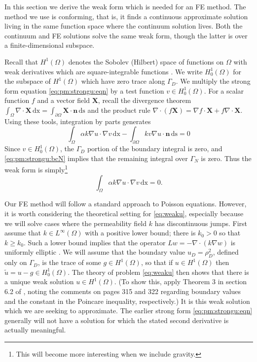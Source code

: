 \documentclass[11pt]{amsart}
\newcommand{\bn}{\mathbf{n}}
\newcommand{\bX}{\mathbf{X}}
\newcommand{\dx}{\mathrm{dx}}
\newcommand{\ds}{\mathrm{ds}}
\newcommand{\Div}{\nabla\cdot}
\newcommand{\grad}{\nabla}
\begin{document}
In this section we derive the weak form which is needed for an FE method.  The method we use is conforming, that is, it finds a continuous approximate solution living in the same function space where the continuum solution lives.  Both the continuum and FE solutions solve the same weak form, though the latter is over a finite-dimensional subspace.

Recall that $H^1(\Omega)$ denotes the Sobolev (Hilbert) space of functions on $\Omega$ with weak derivatives which are square-integrable functions \citep[chapter 5]{Evans2010}.  We write $H_0^1(\Omega)$ for the subspace of $H^1(\Omega)$ which have zero trace along $\Gamma_D$.  We multiply the strong form equation \eqref{eq:pm:strongu:eqn} by a test function $v \in H_0^1(\Omega)$.  For a scalar function $f$ and a vector field $\bX$, recall the divergence theorem $\int_\Omega \Div \bX\,\dx = \int_{\partial \Omega} \bX\cdot \bn\,\ds$ and the product rule $\Div(f\bX) = \grad f \cdot \bX + f \Div \bX$.  Using these tools, integration by parts generates
\begin{equation}
\int_\Omega \alpha k \grad u \cdot \grad v\,\dx - \int_{\partial\Omega} k v \grad u \cdot \bn\,\ds = 0 \label{eq:weaku:early}
\end{equation}
Since $v\in H_0^1(\Omega)$, the $\Gamma_D$ portion of the boundary integral is zero, and \eqref{eq:pm:strongu:bcN} implies that the remaining integral over $\Gamma_N$ is zero.  Thus the weak form is simply\footnote{This will become more interesting when we include gravity.}
\begin{equation}
\int_\Omega \alpha k \grad u \cdot \grad v\,\dx = 0. \label{eq:weaku}
\end{equation}

Our FE method will follow a standard approach to Poisson equations.  However, it is worth considering the theoretical setting for \eqref{eq:weaku}, especially because we will solve cases where the permeability field $k$ has discontinuous jumps.  First assume that $k\in L^\infty(\Omega)$ with a positive lower bound; there is $k_0>0$ so that $k \ge k_0$.  Such a lower bound implies that the operator $L w = - \Div(k \grad w)$ is uniformly elliptic \citep[section 6.1]{Evans2010}.  We will assume that the boundary value $u_D = \rho_D^2$, defined only on $\Gamma_D$, is the trace of some $g\in H^1(\Omega)$, so that if $u\in H^1(\Omega)$ then $\tilde u = u - g \in H_0^1(\Omega)$.  The theory of problem \eqref{eq:weaku} then shows that there is a unique weak solution $u\in H^1(\Omega)$.  (To show this, apply Theorem 3 in section 6.2 of \citep{Evans2010}, noting the comments on pages 315 and 322 regarding boundary values and the constant in the Poincare inequality, respectively.)  It is this weak solution which we are seeking to approximate.  The earlier strong form \eqref{eq:pm:strongu:eqn} generally will not have a solution for which the stated second derivative is actually meaningful.
\end{document}
